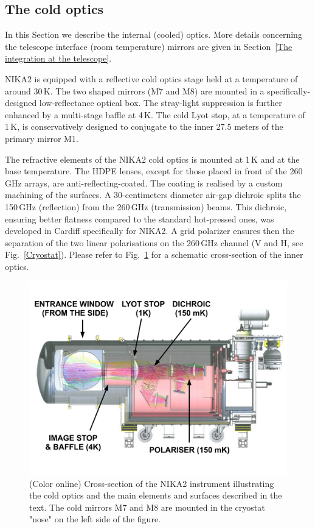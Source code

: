 \documentclass[]{aa} %
\begin{document}
 \subsection{The cold optics}

In this Section we describe the internal (cooled) optics. More details concerning the telescope interface (room temperature) mirrors are given in Section~\ref{The integration at the telescope}.

NIKA2 is equipped with a reflective cold optics stage held at a temperature of around 30\,K. The two shaped mirrors (M7 and M8) are mounted in a specifically-designed low-reflectance optical box. The stray-light suppression is further enhanced by a multi-stage baffle at 4\,K. The cold Lyot stop, at a temperature of 1\,K, is conservatively designed to conjugate to the inner 27.5 meters of the primary mirror M1.

The refractive elements of the NIKA2 cold optics is mounted at 1\,K and at the base temperature. The HDPE lenses, except for those placed in front of the 260\,GHz arrays, are anti-reflecting-coated. The coating is realised by a custom machining of the surfaces. A 30-centimeters diameter air-gap dichroic splits the 150\,GHz (reflection) from the 260\,GHz (transmission) beams. This dichroic, ensuring better flatness compared to the standard hot-pressed ones, was developed in Cardiff specifically for NIKA2. A grid polarizer ensures then the separation of the two linear polarisations on the 260\,GHz channel (V and H, see Fig.~\ref{Cryostat}). Please refer to Fig.~\ref{Cryostat_optics} for a schematic cross-section of the inner optics.

\begin{figure}[h]
   \centering
   \includegraphics[width=.95\linewidth]{NIKA2_optics.pdf}
      \caption{(Color online) Cross-section of the NIKA2 instrument illustrating the cold optics and the main elements and surfaces described in the text. The cold mirrors M7 and M8 are mounted in the cryostat "nose" on the left side of the figure.}
         \label{Cryostat_optics}
\end{figure}
\end{document}

